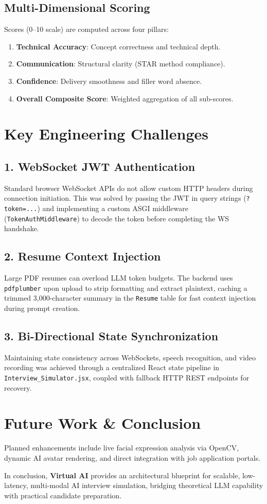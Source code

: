 \documentclass[twocolumn, 10pt, a4paper]{article}
\begin{document}
\subsection{Multi-Dimensional Scoring}
Scores (0--10 scale) are computed across four pillars:
\begin{enumerate}
    \item \textbf{Technical Accuracy}: Concept correctness and technical depth.
    \item \textbf{Communication}: Structural clarity (STAR method compliance).
    \item \textbf{Confidence}: Delivery smoothness and filler word absence.
    \item \textbf{Overall Composite Score}: Weighted aggregation of all sub-scores.
\end{enumerate}

\section{Key Engineering Challenges}

\subsection{1. WebSocket JWT Authentication}
Standard browser WebSocket APIs do not allow custom HTTP headers during connection initiation. This was solved by passing the JWT in query strings (\texttt{?token=...}) and implementing a custom ASGI middleware (\texttt{TokenAuthMiddleware}) to decode the token before completing the WS handshake.

\subsection{2. Resume Context Injection}
Large PDF resumes can overload LLM token budgets. The backend uses \texttt{pdfplumber} upon upload to strip formatting and extract plaintext, caching a trimmed 3,000-character summary in the \texttt{Resume} table for fast context injection during prompt creation.

\subsection{3. Bi-Directional State Synchronization}
Maintaining state consistency across WebSockets, speech recognition, and video recording was achieved through a centralized React state pipeline in \texttt{Interview\_Simulator.jsx}, coupled with fallback HTTP REST endpoints for recovery.

\section{Future Work \& Conclusion}
Planned enhancements include live facial expression analysis via OpenCV, dynamic AI avatar rendering, and direct integration with job application portals.

In conclusion, \textbf{Virtual AI} provides an architectural blueprint for scalable, low-latency, multi-modal AI interview simulation, bridging theoretical LLM capability with practical candidate preparation.
\end{document}
